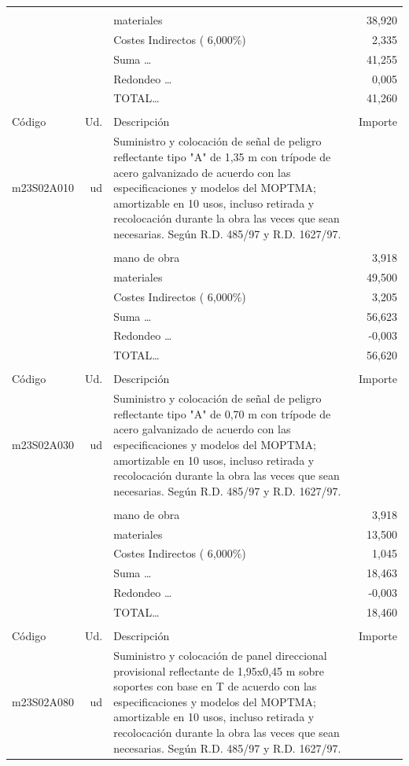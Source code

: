 \begin{supertabular}{l r p{60mm} r}
&&&\\%
&&materiales&    38,920\\%
&&Costes Indirectos (     6,000\%)&     2,335\\%
&&Suma \ldots&    41,255\\%
&&Redondeo \ldots&     0,005\\%
%
&&TOTAL\ldots&    41,260\\%
&&&\\%
Código&Ud.&Descripción&Importe\\%
\hline%
m23S02A010&ud&Suministro y colocación de señal de peligro reflectante tipo "A" de 1,35 m con trípode de acero galvanizado de acuerdo con las especificaciones y modelos del MOPTMA; amortizable en 10 usos, incluso retirada y recolocación durante la obra las veces que sean necesarias. Según R.D. 485/97 y R.D. 1627/97.&\\%
&&&\\%
&&mano de obra&     3,918\\%
&&materiales&    49,500\\%
&&Costes Indirectos (     6,000\%)&     3,205\\%
&&Suma \ldots&    56,623\\%
&&Redondeo \ldots&    {-}0,003\\%
%
&&TOTAL\ldots&    56,620\\%
&&&\\%
Código&Ud.&Descripción&Importe\\%
\hline%
m23S02A030&ud&Suministro y colocación de señal de peligro reflectante tipo "A" de 0,70 m con trípode de acero galvanizado de acuerdo con las especificaciones y modelos del MOPTMA; amortizable en 10 usos, incluso retirada y recolocación durante la obra las veces que sean necesarias. Según R.D. 485/97 y R.D. 1627/97.&\\%
&&&\\%
&&mano de obra&     3,918\\%
&&materiales&    13,500\\%
&&Costes Indirectos (     6,000\%)&     1,045\\%
&&Suma \ldots&    18,463\\%
&&Redondeo \ldots&    {-}0,003\\%
%
&&TOTAL\ldots&    18,460\\%
&&&\\%
Código&Ud.&Descripción&Importe\\%
\hline%
m23S02A080&ud&Suministro y colocación de panel direccional provisional reflectante de 1,95x0,45 m sobre soportes con base en T de acuerdo con las especificaciones y modelos del MOPTMA; amortizable en 10 usos, incluso retirada y recolocación durante la obra las veces que sean necesarias. Según R.D. 485/97 y R.D. 1627/97.&\\%

\end{supertabular}
